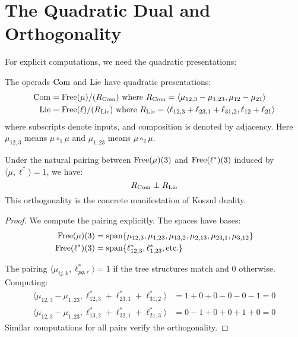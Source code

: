 \section{The Quadratic Dual and Orthogonality}
 
For explicit computations, we need the quadratic presentations:
 
\begin{proposition}
The operads $\operatorname{Com}$ and $\operatorname{Lie}$ have quadratic presentations:
\begin{align}
\operatorname{Com} &= \operatorname{Free}(\mu)/(R_{\operatorname{Com}}) \text{ where } R_{\operatorname{Com}} = \langle \mu_{12,3} - \mu_{1,23}, \mu_{12} - \mu_{21} \rangle \\
\operatorname{Lie} &= \operatorname{Free}(\ell)/(R_{\operatorname{Lie}}) \text{ where } R_{\operatorname{Lie}} = \langle \ell_{12,3} + \ell_{23,1} + \ell_{31,2}, \ell_{12} + \ell_{21} \rangle
\end{align}
where subscripts denote inputs, and composition is denoted by adjacency. Here $\mu_{12,3}$ means $\mu \circ_1 \mu$ and $\mu_{1,23}$ means $\mu \circ_2 \mu$.
\end{proposition}
 
\begin{proposition}[Orthogonality]\label{prop:orthogonal}
Under the natural pairing between $\operatorname{Free}(\mu)(3)$ and $\operatorname{Free}(\ell^*)(3)$ induced by $\langle \mu, \ell^* \rangle = 1$, we have:
\[
R_{\operatorname{Com}} \perp R_{\operatorname{Lie}}
\]
This orthogonality is the concrete manifestation of Koszul duality.
\end{proposition}
 
\begin{proof}
We compute the pairing explicitly. The spaces have bases:
\begin{align}
\operatorname{Free}(\mu)(3) &= \text{span}\{\mu_{12,3}, \mu_{1,23}, \mu_{13,2}, \mu_{2,13}, \mu_{23,1}, \mu_{3,12}\} \\
\operatorname{Free}(\ell^*)(3) &= \text{span}\{\ell^*_{12,3}, \ell^*_{1,23}, \text{etc.}\}
\end{align}
 
The pairing $\langle \mu_{ij,k}, \ell^*_{pq,r} \rangle = 1$ if the tree structures match and $0$ otherwise. Computing:
\begin{align}
\langle \mu_{12,3} - \mu_{1,23}, \ell^*_{12,3} + \ell^*_{23,1} + \ell^*_{31,2} \rangle &= 1 + 0 + 0 - 0 - 0 - 1 = 0 \\
\langle \mu_{12,3} - \mu_{1,23}, \ell^*_{13,2} + \ell^*_{32,1} + \ell^*_{21,3} \rangle &= 0 - 1 + 0 + 0 + 1 + 0 = 0
\end{align}
Similar computations for all pairs verify the orthogonality.
\end{proof}
